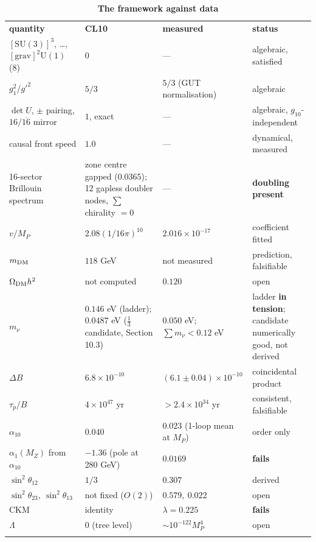 \documentclass[aps,prd,twocolumn,amsmath,amssymb,superscriptaddress,nofootinbib,floatfix]{revtex4-2}
\newcommand{\grayhline}{\noalign{\vskip1pt{\color{black!30}\hrule height 0.3pt}\color{black}\vskip3pt}}
\begin{document}
\begin{table}[t]
\caption{\textbf{The framework against data}}
\label{tab:4}
\footnotesize
\begin{tabular}{@{}p{}p{}p{}p{}@{}}
\toprule
\textbf{quantity} & \textbf{CL10} & \textbf{measured} & \textbf{status} \\ \addlinespace[2pt] \midrule
\([\mathrm{SU}(3)]^3\), \ldots, \([\mathrm{grav}]^2\mathrm{U}(1)\) (8) & \(0\) & --- & algebraic, satisfied \\ \addlinespace[2pt]
\grayhline
\(g_1^2/g'^2\) & \(5/3\) & \(5/3\) (GUT normalisation) & algebraic \\ \addlinespace[2pt]
\grayhline
\(\det U\), \(\pm\) pairing, \(16/\overline{16}\) mirror & \(1\), exact & --- & algebraic, \(g_{10}\)-independent \\ \addlinespace[2pt]
\grayhline
causal front speed & \(1.0\) & --- & dynamical, measured \\ \addlinespace[2pt]
\grayhline
16-sector Brillouin spectrum & zone centre gapped (\(0.0365\)); 12 gapless doubler nodes, \(\sum\)
chirality \(= 0\) & --- & \textbf{doubling present} \\ \addlinespace[2pt]
\grayhline
\(v/M_P\) & \(2.08(1/16\pi)^{10}\) & \(2.016\times10^{-17}\) & coefficient fitted \\ \addlinespace[2pt]
\grayhline
\(m_{\rm DM}\) & \(118\) GeV & not measured & prediction, falsifiable \\ \addlinespace[2pt]
\grayhline
\(\Omega_{\rm DM}h^2\) & not computed & \(0.120\) \cite{ref14} & open \\ \addlinespace[2pt]
\grayhline
\(m_\nu\) & \(0.146\) eV (ladder); \(0.0487\) eV (\(\tfrac13\) candidate, Section
10.3) & \(0.050\) eV; \(\sum m_\nu < 0.12\) eV & ladder \textbf{in tension}; candidate numerically good, not derived \\ \addlinespace[2pt]
\grayhline
\(\Delta B\) & \(6.8\times10^{-10}\) & \((6.1\pm0.04)\times10^{-10}\) & coincidental product \\ \addlinespace[2pt]
\grayhline
\(\tau_p/B\) & \(4\times10^{47}\) yr & \(>2.4\times10^{34}\) yr & consistent, falsifiable \\ \addlinespace[2pt]
\grayhline
\(\alpha_{10}\) & \(0.040\) & \(0.023\) (1-loop mean at \(M_P\)) & order only \\ \addlinespace[2pt]
\grayhline
\(\alpha_1(M_Z)\) from \(\alpha_{10}\) & \(-1.36\) (pole at 280 GeV) & \(0.0169\) & \textbf{fails} \\ \addlinespace[2pt]
\grayhline
\(\sin^2\theta_{12}\) & \(1/3\) & \(0.307\) & derived \\ \addlinespace[2pt]
\grayhline
\(\sin^2\theta_{23},\ \sin^2\theta_{13}\) & not fixed (\(O(2)\)) & \(0.579,\ 0.022\) \cite{ref17,ref50} & open \\ \addlinespace[2pt]
\grayhline
CKM & identity & \(\lambda = 0.225\) \cite{ref13,ref44} & \textbf{fails} \\ \addlinespace[2pt]
\grayhline
\(\Lambda\) & \(0\) (tree level) & \(\sim 10^{-122}M_P^4\) & open \\ \addlinespace[2pt] \bottomrule
\end{tabular}
\end{table}
\end{document}
